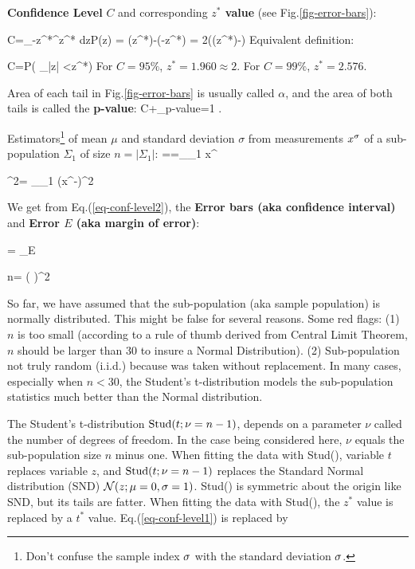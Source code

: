 {\bf Confidence Level} $C$
and corresponding {\bf $z^*$ value}
(see Fig.\ref{fig-error-bars}):

\beq
C=\int_{-z^*}^{z^*} dz\;P(z) = 
\Phi(z^*)-\Phi(-z^*)
=
2\left(\Phi(z^*)-\right)
\label{eq-conf-level1}
\eeq
Equivalent definition:

\beq
C=P\left(
_{|z|}
<z^*\right)
\label{eq-conf-level2}
\eeq
For $C=95\%$,
$z^*=1.960\approx 2$.
For $C=99\%$, $z^*=2.576$.

Area of each tail 
in Fig.\ref{fig-error-bars} is
usually called $\alpha$,
and the area of both tails is called
the {\bf p-value}:
\beq
C+\underbrace{2\alpha}_{p-value}=1
\;.
\eeq  

Estimators\footnote{Don't 
confuse the sample index $\sigma$
with the standard deviation $\sigma$.} of 
mean $\mu$  and 
standard deviation $\sigma$
from measurements $x^\sigma$
of a sub-population $\Sigma_1$ of
size $n=|\Sigma_1|$:
\beq
\hat{\mu}==\sum_{\s \in\Sigma_1} x^\s
\eeq

\beq
\hat{\s}^2=
\sum_{\s\in \Sigma_1} (x^\s-)^2
\eeq


We get
from Eq.(\ref{eq-conf-level2}),
the {\bf Error bars (aka confidence interval)}
and 
{\bf Error $E$ (aka margin of error)}:



\beq
{} =
 \pm 
{}_{E}
\label{eq-err-bars}
\eeq

\beq
n= \left(
\right)^2
\eeq

So far, we have assumed
that the sub-population (aka sample
population)
is normally distributed.
This might be false
for several reasons.
Some red flags: (1)
$n$ is too small (according to
a rule of thumb derived from
Central Limit Theorem, $n$
should be larger than 30
to insure a Normal Distribution).
(2) Sub-population not truly random 
(i.i.d.) 
because was taken
without replacement.
In many cases,
especially
when $n<30$,
the Student's t-distribution
models the sub-population statistics
much
better than the Normal distribution.


The {\rm Student's t-distribution } ${\rm Stud}(t;
\nu=n-1)$,
depends
on a parameter $\nu$
called the
number of
degrees of freedom.
In the case being considered here,
$\nu$ equals the 
sub-population size $n$
minus one.
When fitting
the data with
Stud(), variable
$t$ replaces
variable $z$,
and ${\rm Stud}(t; \nu=n-1)$
replaces the Standard Normal distribution (SND) 
${\cal N}(z; \mu=0, \sigma=1)$.
Stud() is symmetric about
the origin like SND,
but its tails
are fatter.
When fitting the data with Stud(),
the $z^*$
value is replaced 
by a $t^*$ value.
Eq.(\ref{eq-conf-level1})
is replaced by


